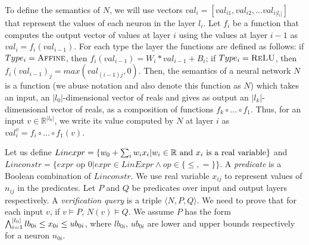 

To define the semantics of $N$, we will use vectors ${val_i} = [val_{i1}, val_{i2}, ... val_{i|l_i|}]$ that represent the values of each neuron in the layer $l_i$. Let $f_i$ be a function that computes the output vector of values at layer $i$ using the values at layer $i-1$ as $val_i = f_i(val_{i-1})$. For each type the layer the functions are defined as follows: if $Type_i = \textsc{Affine}$, then $f_{i}(val_{i-1}) = W_i * val_{i-1} + B_i$; if $Type_i = \textsc{ReLU}$, then $f_{i}(val_{i-1})_j =  max(val_{{(i-1)}j},0)$. Then, the semantics of a neural network $N$ is a function (we abuse notation and also denote this function as $N$) which takes an input, an $|l_0|$-dimensional vector of reals and gives as output an $|l_k|$-dimensional vector of reals, as a composition of functions $f_k \circ ... \circ f_1$. Thus, for an input $v\in \mathbb{R}^{|l_0|}$, we write its value computed by $N$ at layer $i$ as $val^v_{i}=f_i \circ ... \circ f_1(v)$.

Let us define 
$Linexpr = \{ w_0 + \sum_{i} w_i x_i | w_i \in \mathbb{R} \text{ and } x_i \text{ is a real variable} \}$
and
$Linconstr = \{expr \text{ op } 0 | expr \in LinExpr \land op \in \{\leq, = \}\}$.
A {\em predicate} is a Boolean combination of $Linconstr$.
We use real variable $x_{ij}$ to represent values of $n_{ij}$ in the predicates.
Let $P$ and $Q$ be predicates over input and output layers respectively.
A {\em verification query} is a triple $\langle N, P, Q \rangle$.
We need to prove that for each input ${v}$,
if ${v} \models P$, $N({v}) \models Q$.
We assume $P$ has the form
$\bigwedge_{i=1}^{|l_0|}lb_{0i} \leq x_{0i} \leq ub_{0i}$, where $lb_{0i}$, $ub_{0i}$ are lower and upper bounds respectively for a neuron $n_{0i}$.





